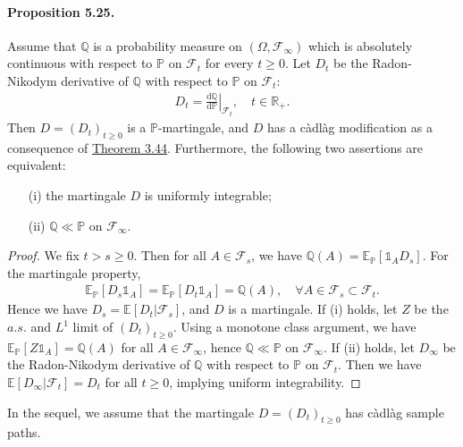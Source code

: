 \documentclass{article}
\numberwithin{equation}{section}
\newcommand{\E}{\mathbb{E}}
\renewcommand{\P}{\mathbb{P}}
\newcommand{\bbP}{\mathbb{P}}
\newcommand{\bbQ}{\mathbb{Q}}
\renewcommand{\d}{\mathrm{d}}
\theoremstyle{plain}
\theoremstyle{definition}
\begin{document}
\paragraph{Proposition 5.25.\label{prop:5.25}} Assume that $\bbQ$ is a probability measure on $(\Omega,\mathscr{F}_\infty)$ which is absolutely continuous with respect to $\bbP$ on $\mathscr{F}_t$ for every $t\geq 0$. Let $D_t$ be the Radon-Nikodym derivative of $\bbQ$ with respect to $\bbP$ on $\mathscr{F}_t$:
\begin{align*}
	D_t = \left.\frac{\d\bbQ}{\d\bbP}\right|_{\mathscr{F}_t},\quad t\in\mathbb{R}_+.
\end{align*}
Then $D=(D_t)_{t\geq 0}$ is a $\P$-martingale, and $D$ has a càdlàg modification as a consequence of \hyperref[thm:3.44]{Theorem 3.44}. Furthermore, the following two assertions are equivalent:
\begin{itemize}
	\item[(i)] the martingale $D$ is uniformly integrable;
	\item[(ii)] $\bbQ\ll\bbP$ on $\mathscr{F}_\infty$.
\end{itemize}
\begin{proof}
We fix $t>s\geq 0$. Then for all $A\in\mathscr{F}_s$, we have $\bbQ(A) = \E_\bbP[\mathds{1}_A D_s]$. For the martingale property,
\begin{align*}
	\E_\bbP\left[D_s\mathds{1}_A\right]=\E_\bbP\left[D_t\mathds{1}_A\right]=\bbQ(A),\quad\forall A\in\mathscr{F}_s\subset\mathscr{F}_t.
\end{align*}
Hence we have $D_s=\E[D_t|\mathscr{F}_s]$, and $D$ is a martingale. If (i) holds, let $Z$ be the $a.s.$ and $L^1$ limit of $(D_t)_{t\geq 0}$. Using a monotone class argument, we have $\E_\bbP[Z\mathds{1}_A]=\bbQ(A)$ for all $A\in\mathscr{F}_\infty$, hence $\bbQ\ll\bbP$ on $\mathscr{F}_\infty$. If (ii) holds, let $D_\infty$ be the Radon-Nikodym derivative of $\bbQ$ with respect to $\bbP$ on $\mathscr{F}_t$. Then we have $\E[D_\infty|\mathscr{F}_t]=D_t$ for all $t\geq 0$, implying uniform integrability.
\end{proof}

In the sequel, we assume that the martingale $D=(D_t)_{t\geq 0}$ has càdlàg sample paths.
\end{document}
